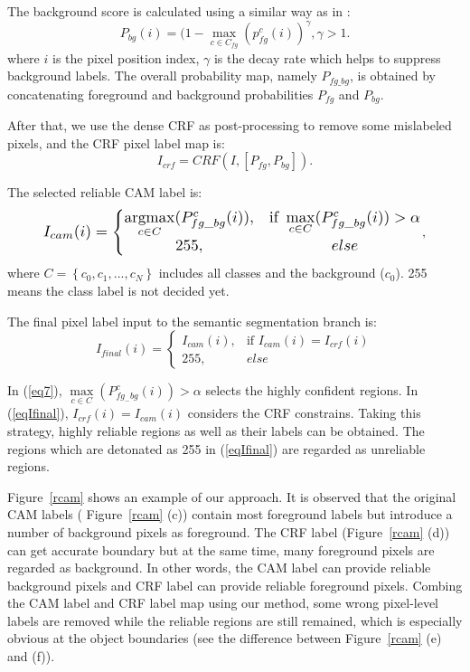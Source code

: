 \documentclass[letterpaper]{article} \usepackage{aaai20}  \usepackage{times}  \usepackage{helvet} \usepackage{courier}  \usepackage[hyphens]{url}  \usepackage{graphicx} \urlstyle{rm} \def\UrlFont{\rm}  \usepackage{graphicx}  \frenchspacing  \setlength{\pdfpagewidth}{8.5in}  \setlength{\pdfpageheight}{11in}
\DeclareMathOperator*{\argmax}{argmax}
\begin{document}
The background score is calculated using a similar way as in  \cite{ahn2018learning}:
\begin{equation}
P_{bg}(i) = (1 - \max_{c \in C_{fg}}(p_{fg}^{c}(i))^{\gamma}, \gamma > 1.\label{eq3}
\end{equation}
where $i$ is the pixel position index, $\gamma$ is the decay rate which helps to suppress background labels. The overall probability map, namely $P_{fg\_bg}$, is obtained by concatenating foreground and background probabilities $P_{fg}$ and $P_{bg}$.

After that, we use the dense CRF \cite{krahenbuhl2013parameter} as post-processing to remove some mislabeled pixels, and the CRF pixel label map is:
\begin{equation}
I_{crf} = CRF(I,[P_{fg}, P_{bg}]). \label{eq6}
\end{equation}


The selected reliable CAM label is:
\begin{equation}
\resizebox{0.87\columnwidth}{!}{$
I_{cam}(i)=\left\{\begin{matrix}
\argmax\limits_{c \in C}(P_{fg\_bg}^{c}(i)), & \text{if } \max\limits_{c \in C}(P_{fg\_bg}^{c}(i)) > \alpha\\ 
255, & else
\end{matrix}\right.$}, \label{eq7}
\end{equation}
where $C= \left \{ c_0,c_1,...,c_N \right \}$ includes all classes and the background ($c_0$). 255 means the class label is not decided yet.

The final pixel label input to the semantic segmentation branch is:
\begin{equation}
I_{final}(i) = \left\{\begin{matrix}
I_{cam}(i), & \text{if }  I_{cam}(i) =I_{crf}(i) \\ 
255, & else 
\end{matrix}\right.  \label{eqIfinal}
\end{equation}

In (\ref{eq7}), $\max\limits_{c \in C}(P_{fg_{-}bg}^{c}(i)) > \alpha$ selects the highly confident regions. In (\ref{eqIfinal}), $I_{crf}(i) = I_{cam}(i)$ considers the CRF constrains. Taking this strategy, highly reliable regions as well as their labels can be obtained. The regions which are detonated as 255 in (\ref{eqIfinal}) are regarded as unreliable regions.

Figure~\ref{rcam} shows an example of our approach. It is observed that the original CAM labels ( Figure~\ref{rcam} (c)) contain most foreground labels but introduce a number of background pixels as foreground. The CRF label (Figure~\ref{rcam} (d)) can get accurate boundary but at the same time, many foreground pixels are regarded as background. In other words, the CAM label can provide reliable background pixels and CRF label can provide reliable foreground pixels. Combing the CAM label and CRF label map using our method, some wrong pixel-level labels are removed while the reliable regions are still remained, which is especially obvious at the object boundaries (see the difference between Figure~\ref{rcam} (e) and (f)).
\end{document}
